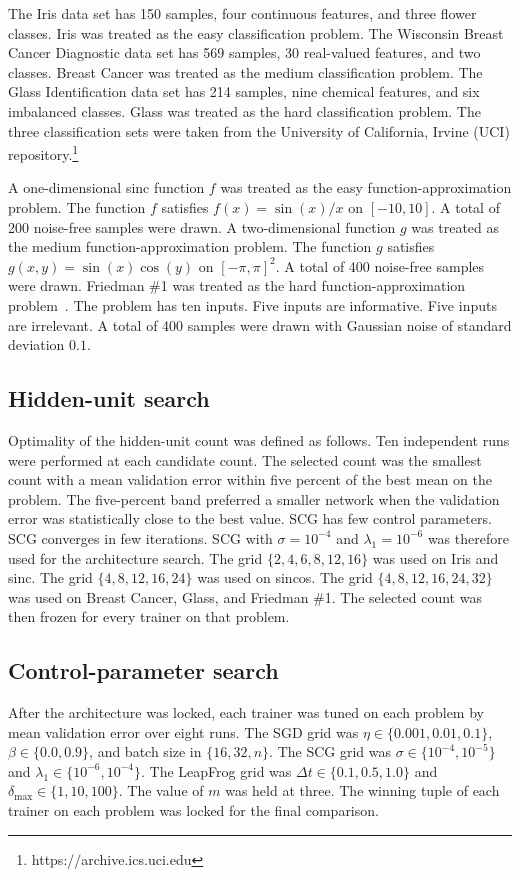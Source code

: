 \documentclass[conference,10pt]{IEEEtran}
\begin{document}
The Iris data set has 150 samples, four continuous features, and three flower classes.
Iris was treated as the easy classification problem.
The Wisconsin Breast Cancer Diagnostic data set has 569 samples, 30 real-valued features, and two classes.
Breast Cancer was treated as the medium classification problem.
The Glass Identification data set has 214 samples, nine chemical features, and six imbalanced classes.
Glass was treated as the hard classification problem.
The three classification sets were taken from the University of California, Irvine (UCI) repository.\footnote{https://archive.ics.uci.edu}

A one-dimensional sinc function $f$ was treated as the easy function-approximation problem.
The function $f$ satisfies $f(x)=\sin(x)/x$ on $[-10,10]$.
A total of 200 noise-free samples were drawn.
A two-dimensional function $g$ was treated as the medium function-approximation problem.
The function $g$ satisfies $g(x,y)=\sin(x)\cos(y)$ on $[-\pi,\pi]^{2}$.
A total of 400 noise-free samples were drawn.
Friedman \#1 was treated as the hard function-approximation problem~\cite{friedman1991}.
The problem has ten inputs.
Five inputs are informative.
Five inputs are irrelevant.
A total of 400 samples were drawn with Gaussian noise of standard deviation $0.1$.

\subsection{Hidden-unit search}
\label{sec:hu}
Optimality of the hidden-unit count was defined as follows.
Ten independent runs were performed at each candidate count.
The selected count was the smallest count with a mean validation error within five percent of the best mean on the problem.
The five-percent band preferred a smaller network when the validation error was statistically close to the best value.
SCG has few control parameters.
SCG converges in few iterations.
SCG with $\sigma=10^{-4}$ and $\lambda_{1}=10^{-6}$ was therefore used for the architecture search.
The grid $\{2,4,6,8,12,16\}$ was used on Iris and sinc.
The grid $\{4,8,12,16,24\}$ was used on sincos.
The grid $\{4,8,12,16,24,32\}$ was used on Breast Cancer, Glass, and Friedman \#1.
The selected count was then frozen for every trainer on that problem.

\subsection{Control-parameter search}
\label{sec:cp}
After the architecture was locked, each trainer was tuned on each problem by mean validation error over eight runs.
The SGD grid was $\eta\in\{0.001,0.01,0.1\}$, $\beta\in\{0.0,0.9\}$, and batch size in $\{16,32,n\}$.
The SCG grid was $\sigma\in\{10^{-4},10^{-5}\}$ and $\lambda_{1}\in\{10^{-6},10^{-4}\}$.
The LeapFrog grid was $\Delta t\in\{0.1,0.5,1.0\}$ and $\delta_{\max}\in\{1,10,100\}$.
The value of $m$ was held at three.
The winning tuple of each trainer on each problem was locked for the final comparison.
\end{document}
